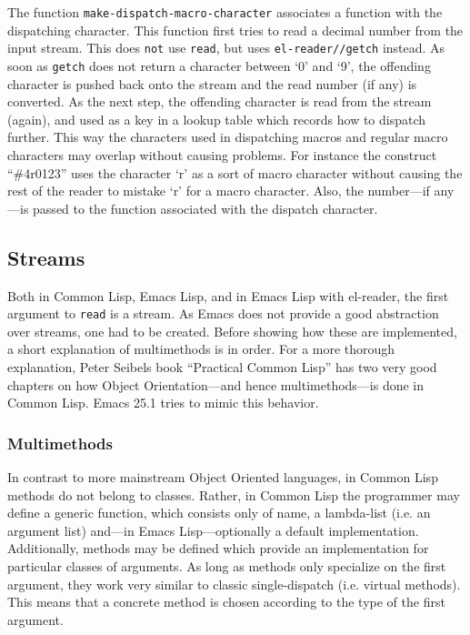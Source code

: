 \documentclass[a4paper,10pt,twoside]{report}
\newcommand{\el}{Emacs Lisp}
\newcommand{\cl}{Common Lisp}
\newcommand{\elr}{el-reader}
\newcommand{\fun}[1]{\texttt{#1}}
\newcommand{\Read}{\fun{read}}
\begin{document}
The function \fun{make-dispatch-macro-character} associates a function
with the dispatching character.  This function first tries to read a decimal
number from the input stream.  This does \texttt{not} use \Read{}, but uses
\fun{el-reader//getch} instead.  As soon as \fun{getch} does not return a
character between `0' and `9', the offending character is pushed back onto the
stream and the read number (if any) is converted.  As the next step, the offending
character is read from the stream (again), and used as a key in a lookup table
which records how to dispatch further.  This way the characters used in
dispatching macros and regular macro characters may overlap without causing
problems.  For instance the construct ``\#4r0123'' uses the character `r' as a
sort of macro character without causing the rest of the reader to mistake `r'
for a macro character.  Also, the number---if any---is passed to the function
associated with the dispatch character.

\subsection{Streams}
\label{subsec:streams}

Both in \cl{}, \el{}, and in \el{} with \elr{}, the first argument to \Read{} is
a stream.  As Emacs does not provide a good abstraction over streams, one had to
be created.  Before showing how these are implemented, a short explanation of
multimethods is in order.  For a more thorough explanation, Peter Seibels book
``Practical Common Lisp'' has two very good chapters on how Object
Orientation---and hence multimethods---is done in \cl{}.\cite{pcl} Emacs 25.1
tries to mimic this behavior.

\subsubsection{Multimethods}
\label{subsubsec:multimethods}

In contrast to more mainstream Object Oriented languages, in \cl{} methods do
not belong to classes.  Rather, in \cl{} the programmer may define a generic
function, which consists only of name, a lambda-list (i.e. an argument list)
and---in \el{}---optionally a default implementation.  Additionally, methods may
be defined which provide an implementation for particular classes of arguments.
As long as methods only specialize on the first argument, they work very similar
to classic single-dispatch (i.e. virtual methods).  This means that a concrete
method is chosen according to the type of the first argument.
\end{document}
